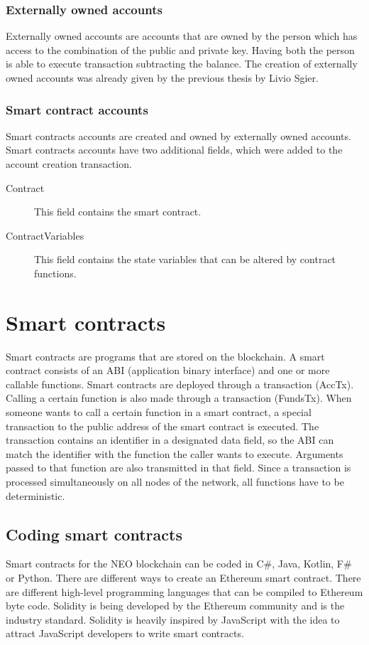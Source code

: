 \subsubsection{Externally owned accounts}
Externally owned accounts are accounts that are owned by the person which has access to the combination of the public and private key. Having both the person is able to execute transaction subtracting the balance. The creation of externally owned accounts was already given by the previous thesis by Livio Sgier.

\subsubsection{Smart contract accounts}
Smart contracts accounts are created and owned by externally owned accounts. Smart contracts accounts have two additional fields, which were added to the account creation transaction.

\begin{description}
  \item[Contract] This field contains the smart contract.
  \item[ContractVariables] This field contains the state variables that can be altered by contract functions.
\end{description}

\section{Smart contracts}
Smart contracts are programs that are stored on the blockchain. A smart contract consists of an ABI (application binary interface) and one or more callable functions. Smart contracts are deployed through a transaction (AccTx). Calling a certain function is also made through a transaction (FundsTx). When someone wants to call a certain function in a smart contract, a special transaction to the public address of the smart contract is executed. The transaction contains an identifier in a designated data field, so the ABI can match the identifier with the function the caller wants to execute. Arguments passed to that function are also transmitted in that field. Since a transaction is processed simultaneously on all nodes of the network, all functions have to be deterministic.

\subsection{Coding smart contracts}
Smart contracts for the NEO blockchain can be coded in C\#, Java, Kotlin, F\# or Python. There are different ways to create an Ethereum smart contract. There are different high-level programming languages that can be compiled to Ethereum byte code. Solidity is being developed by the Ethereum community and is the industry standard. Solidity is heavily inspired by JavaScript with the idea to attract JavaScript developers to write smart contracts.

